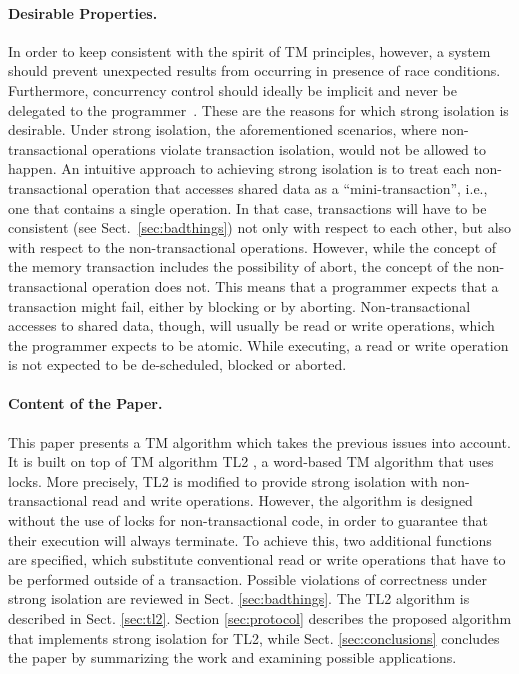 \paragraph{Desirable Properties.}
In order  to keep consistent with  the spirit of TM  principles, however, a
system should prevent unexpected   results  from   occurring  
in presence of  race conditions. 
Furthermore, concurrency   control should  ideally be implicit  
and never be delegated to  the programmer~\cite{CIR12,MS12}.  These are the  
reasons for  which strong isolation  is desirable. Under  strong isolation,
the aforementioned scenarios,   where non-transactional operations  violate
transaction isolation, would not be allowed to happen.  
An  intuitive approach  to  achieving  strong isolation  is  to treat  each
non-transactional operation that 
accesses shared data  as a ``mini-transaction'', i.e., one  that contains a
single operation. In that case,  transactions  will have to  be  
consistent (see Sect.~\ref{sec:badthings})  not only with 
respect to each other, but 
also with respect to the  non-transactional operations. However, while the
concept of the memory  transaction includes the possibility of abort,
the concept of the non-transactional operation does not.  This means that a
programmer expects  that a transaction  
might fail,  either by blocking or by  aborting. Non-transactional accesses
to shared data, though,  
will usually be  read or write operations, which  the programmer expects to
be  atomic. While executing, a  read  or write  operation   is  not 
expected  to  be de-scheduled, blocked or aborted.  



\paragraph{Content of the Paper.}
This paper presents  a TM  algorithm which takes the
previous issues into account. It is built on top of 
TM algorithm TL2 \cite{dice06},  a  word-based  TM algorithm  that  uses locks. 
More precisely,  TL2 is modified to provide strong isolation with non-transactional read 
and write operations.  However,  
the algorithm  is designed  without the use  of locks  for non-transactional
code, in order to guarantee that their execution will always terminate.  
To achieve  this,    two    additional     functions are specified, which substitute 
conventional  read  or write operations that have to be performed  outside  of  a  transaction.  
Possible violations of correctness under strong isolation are reviewed in Sect. 
\ref{sec:badthings}. The TL2 algorithm is described in Sect. \ref{sec:tl2}. 
Section \ref{sec:protocol} describes  the proposed algorithm that implements
strong isolation for TL2, while  
Sect. \ref{sec:conclusions}  concludes the paper by  summarizing the work
and examining possible applications.  





